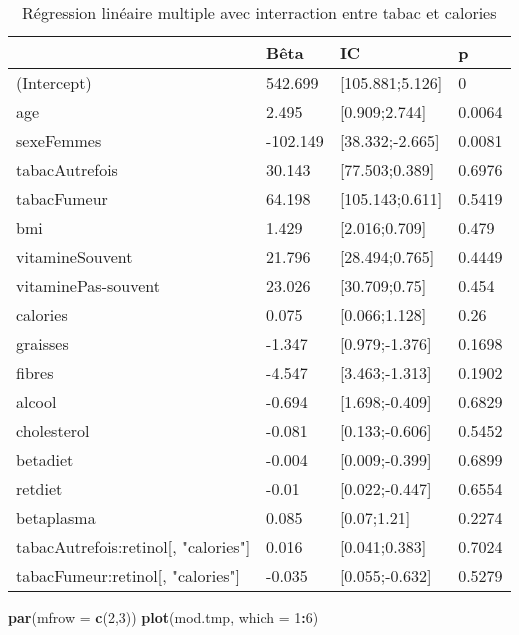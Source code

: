 \documentclass[]{article}
\newenvironment{Shaded}{\begin{snugshade}}{\end{snugshade}}
\newcommand{\KeywordTok}[1]{\textcolor[rgb]{0.13,0.29,0.53}{\textbf{#1}}}
\newcommand{\DataTypeTok}[1]{\textcolor[rgb]{0.13,0.29,0.53}{#1}}
\newcommand{\DecValTok}[1]{\textcolor[rgb]{0.00,0.00,0.81}{#1}}
\newcommand{\OperatorTok}[1]{\textcolor[rgb]{0.81,0.36,0.00}{\textbf{#1}}}
\newcommand{\NormalTok}[1]{#1}
\begin{document}
\begin{table}

\caption{\label{tab:unnamed-chunk-71}Régression linéaire multiple avec interraction entre tabac et calories}
\centering
\begin{tabular}[t]{l|l|l|l}
\hline
  & Bêta & IC & p\\
\hline
\rowcolor[HTML]{BBD2E1}  (Intercept) & 542.699 & [105.881;5.126] & 0\\
\hline
age & 2.495 & [0.909;2.744] & 0.0064\\
\hline
\rowcolor[HTML]{BBD2E1}  sexeFemmes & -102.149 & [38.332;-2.665] & 0.0081\\
\hline
tabacAutrefois & 30.143 & [77.503;0.389] & 0.6976\\
\hline
\rowcolor[HTML]{BBD2E1}  tabacFumeur & 64.198 & [105.143;0.611] & 0.5419\\
\hline
bmi & 1.429 & [2.016;0.709] & 0.479\\
\hline
\rowcolor[HTML]{BBD2E1}  vitamineSouvent & 21.796 & [28.494;0.765] & 0.4449\\
\hline
vitaminePas-souvent & 23.026 & [30.709;0.75] & 0.454\\
\hline
\rowcolor[HTML]{BBD2E1}  calories & 0.075 & [0.066;1.128] & 0.26\\
\hline
graisses & -1.347 & [0.979;-1.376] & 0.1698\\
\hline
\rowcolor[HTML]{BBD2E1}  fibres & -4.547 & [3.463;-1.313] & 0.1902\\
\hline
alcool & -0.694 & [1.698;-0.409] & 0.6829\\
\hline
\rowcolor[HTML]{BBD2E1}  cholesterol & -0.081 & [0.133;-0.606] & 0.5452\\
\hline
betadiet & -0.004 & [0.009;-0.399] & 0.6899\\
\hline
\rowcolor[HTML]{BBD2E1}  retdiet & -0.01 & [0.022;-0.447] & 0.6554\\
\hline
betaplasma & 0.085 & [0.07;1.21] & 0.2274\\
\hline
\rowcolor[HTML]{BBD2E1}  tabacAutrefois:retinol[, "calories"] & 0.016 & [0.041;0.383] & 0.7024\\
\hline
tabacFumeur:retinol[, "calories"] & -0.035 & [0.055;-0.632] & 0.5279\\
\hline
\end{tabular}
\end{table}

\begin{Shaded}
\begin{Highlighting}[]
\KeywordTok{par}\NormalTok{(}\DataTypeTok{mfrow =} \KeywordTok{c}\NormalTok{(}\DecValTok{2}\NormalTok{,}\DecValTok{3}\NormalTok{))}
\KeywordTok{plot}\NormalTok{(mod.tmp, }\DataTypeTok{which =} \DecValTok{1}\OperatorTok{:}\DecValTok{6}\NormalTok{)}
\end{Highlighting}
\end{Shaded}
\end{document}
